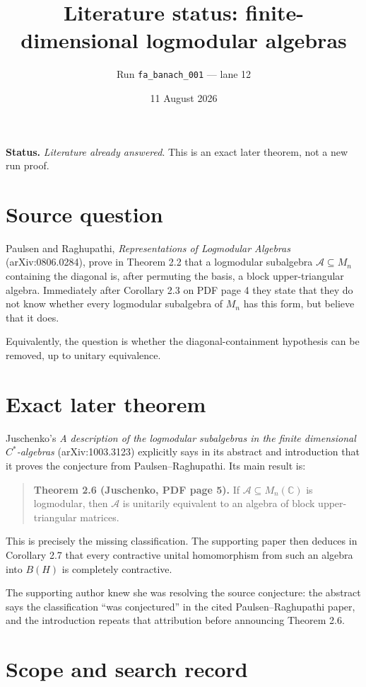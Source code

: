 \documentclass[11pt]{article}
\title{Literature status: finite-dimensional logmodular algebras}
\author{Run \texttt{fa\_banach\_001} --- lane 12}
\date{11 August 2026}
\begin{document}
\maketitle

\noindent\textbf{Status.} \emph{Literature already answered}.  This is an
exact later theorem, not a new run proof.

\section{Source question}

Paulsen and Raghupathi, \emph{Representations of Logmodular Algebras}
(arXiv:0806.0284), prove in Theorem 2.2 that a logmodular subalgebra
$\mathcal A\subseteq M_n$ containing the diagonal is, after permuting the
basis, a block upper-triangular algebra.  Immediately after Corollary 2.3 on
PDF page 4 they state that they do not know whether every logmodular
subalgebra of $M_n$ has this form, but believe that it does.

Equivalently, the question is whether the diagonal-containment hypothesis can
be removed, up to unitary equivalence.

\section{Exact later theorem}

Juschenko's \emph{A description of the logmodular subalgebras in the finite
dimensional $C^*$-algebras} (arXiv:1003.3123) explicitly says in its abstract
and introduction that it proves the conjecture from Paulsen--Raghupathi.  Its
main result is:
\begin{quote}
\textbf{Theorem 2.6 (Juschenko, PDF page 5).}
If $\mathcal A\subseteq M_n(\mathbb C)$ is logmodular, then $\mathcal A$ is
unitarily equivalent to an algebra of block upper-triangular matrices.
\end{quote}
This is precisely the missing classification.  The supporting paper then
deduces in Corollary 2.7 that every contractive unital homomorphism from such
an algebra into $B(H)$ is completely contractive.

The supporting author knew she was resolving the source conjecture: the
abstract says the classification ``was conjectured'' in the cited
Paulsen--Raghupathi paper, and the introduction repeats that attribution
before announcing Theorem 2.6.

\section{Scope and search record}
\end{document}
